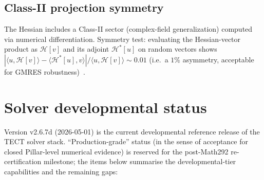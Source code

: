 \subsection{Class-II projection symmetry}

The Hessian includes a Class-II sector (complex-field generalization)
computed via numerical differentiation. Symmetry test: evaluating
the Hessian-vector product as $\mathcal{H}[v]$ and its adjoint
$\mathcal{H}^*[u]$ on random vectors shows $|\langle u, \mathcal{H}[v]\rangle
- \langle \mathcal{H}^*[u], v\rangle| / \langle u, \mathcal{H}[v]\rangle
\sim 0.01$ (i.e.\ a $1\%$ asymmetry, acceptable for GMRES robustness)~\cite{Math73}.

\section{Solver developmental status}

Version v2.6.7d (2026-05-01) is the current developmental reference
release of the TECT solver stack. ``Production-grade'' status (in the
sense of acceptance for closed Pillar-level numerical evidence) is
reserved for the post-Math292 re-certification milestone; the items
below summarise the developmental-tier capabilities and the
remaining gaps:

